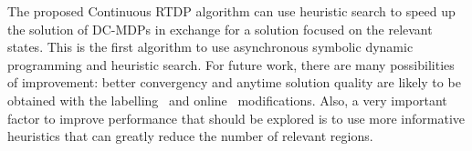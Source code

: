 The proposed Continuous RTDP algorithm can use heuristic search to speed up the solution of DC-MDPs in exchange for a solution focused on the relevant states. This is the first algorithm to use asynchronous symbolic dynamic programming and heuristic search. For future work, there are many possibilities of improvement: better convergency and anytime solution quality are likely to be obtained with the labelling~\cite{Bonet03LRTDP} and online~\cite{kolobov12GOURMAND} modifications. Also, a very important factor to improve performance that should be explored is to use more informative heuristics that can greatly reduce the number of relevant regions. 